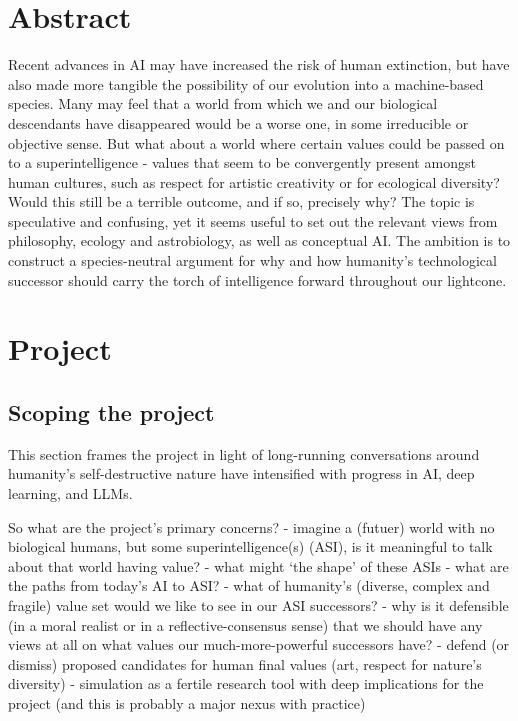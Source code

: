 \documentclass[
]{article}
\author{}
\date{}
\begin{document}
\section{Abstract}\label{abstract}

Recent advances in AI may have increased the risk of human extinction,
but have also made more tangible the possibility of our evolution into a
machine-based species. Many may feel that a world from which we and our
biological descendants have disappeared would be a worse one, in some
irreducible or objective sense. But what about a world where certain
values could be passed on to a superintelligence - values that seem to
be convergently present amongst human cultures, such as respect for
artistic creativity or for ecological diversity? Would this still be a
terrible outcome, and if so, precisely why? The topic is speculative and
confusing, yet it seems useful to set out the relevant views from
philosophy, ecology and astrobiology, as well as conceptual AI. The
ambition is to construct a species-neutral argument for why and how
humanity's technological successor should carry the torch of
intelligence forward throughout our lightcone.

\section{Project}\label{project}

\subsection{Scoping the project}\label{scoping-the-project}

This section frames the project in light of long-running conversations
around humanity's self-destructive nature have intensified with progress
in AI, deep learning, and LLMs.

So what are the project's primary concerns? - imagine a (futuer) world
with no biological humans, but some superintelligence(s) (ASI), is it
meaningful to talk about that world having value? - what might `the
shape' of these ASIs - what are the paths from today's AI to ASI? - what
of humanity's (diverse, complex and fragile) value set would we like to
see in our ASI successors? - why is it defensible (in a moral realist or
in a reflective-consensus sense) that we should have any views at all on
what values our much-more-powerful successors have? - defend (or
dismiss) proposed candidates for human final values (art, respect for
nature's diversity) - simulation as a fertile research tool with deep
implications for the project (and this is probably a major nexus with
practice)
\end{document}
